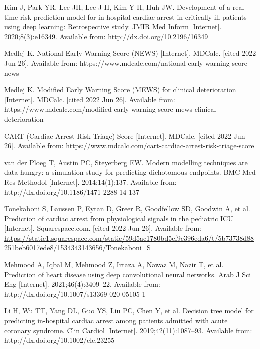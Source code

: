 \begin{thebibliography}{00}
Kim J, Park YR, Lee JH, Lee J-H, Kim Y-H, Huh JW. Development of a real-time risk prediction model for in-hospital cardiac arrest in critically ill patients using deep learning: Retrospective study. JMIR Med Inform [Internet]. 2020;8(3):e16349. Available from: http://dx.doi.org/10.2196/16349
 	 
Medlej K. National Early Warning Score (NEWS) [Internet]. MDCalc. [cited 2022 Jun 26]. Available from: https://www.mdcalc.com/national-early-warning-score-news
 	 
Medlej K. Modified Early Warning Score (MEWS) for clinical deterioration [Internet]. MDCalc. [cited 2022 Jun 26]. Available from: https://www.mdcalc.com/modified-early-warning-score-mews-clinical-deterioration
 	 
CART (Cardiac Arrest Risk Triage) Score [Internet]. MDCalc. [cited 2022 Jun 26]. Available from: https://www.mdcalc.com/cart-cardiac-arrest-risk-triage-score
 	 
van der Ploeg T, Austin PC, Steyerberg EW. Modern modelling techniques are data hungry: a simulation study for predicting dichotomous endpoints. BMC Med Res Methodol [Internet]. 2014;14(1):137. Available from: http://dx.doi.org/10.1186/1471-2288-14-137
 	 
Tonekaboni S, Laussen P, Eytan D, Greer R, Goodfellow SD, Goodwin A, et al. Prediction of cardiac arrest from physiological signals in the pediatric ICU [Internet]. Squarespace.com. [cited 2022 Jun 26]. Available from: \url{https://static1.squarespace.com/static/59d5ac1780bd5ef9c396eda6/t/5b73738d88251beb6017ede8/1534343143656/Tonekaboni\_S}
 	 
Mehmood A, Iqbal M, Mehmood Z, Irtaza A, Nawaz M, Nazir T, et al. Prediction of heart disease using deep convolutional neural networks. Arab J Sci Eng [Internet]. 2021;46(4):3409–22. Available from: http://dx.doi.org/10.1007/s13369-020-05105-1
 	 
Li H, Wu TT, Yang DL, Guo YS, Liu PC, Chen Y, et al. Decision tree model for predicting in-hospital cardiac arrest among patients admitted with acute coronary syndrome. Clin Cardiol [Internet]. 2019;42(11):1087–93. Available from: http://dx.doi.org/10.1002/clc.23255



\end{thebibliography}